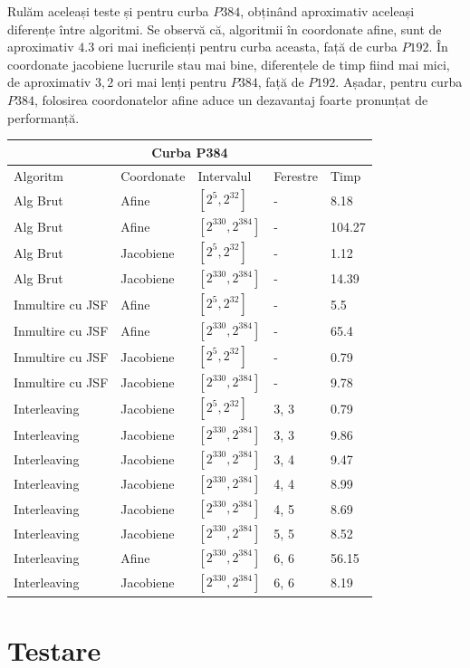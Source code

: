 Rulăm aceleași teste și pentru curba $P384$, obținând aproximativ aceleași diferențe între algoritmi. Se observă că, algoritmii în coordonate afine, sunt de aproximativ $4. 3$ ori mai ineficienți pentru curba aceasta, față de curba $P192$. În coordonate jacobiene lucrurile stau mai bine, diferențele de timp fiind mai mici, de aproximativ $3, 2$ ori mai lenți pentru $P384$, față de $P192$. Așadar, pentru curba $P384$, folosirea coordonatelor afine aduce un dezavantaj foarte pronunțat de performanță.

\begin{tabular}{ |p{5cm}||p{3cm}|p{3cm}|p{2cm}|p{1cm}|  }
 \hline
 \multicolumn{5}{|c|}{Curba P384} \\
  \hline
  Algoritm& Coordonate &Intervalul &Ferestre &Timp\\
 \hline
  Alg Brut & Afine  &$[2^{5},2^{32}]$& - & 8.18\\
 Alg Brut & Afine  &$[2^{330},2^{384}]$& - & 104.27 \\
 Alg Brut & Jacobiene  &$[2^{5},2^{32}]$& - & 1.12 \\
 Alg Brut & Jacobiene  &$[2^{330},2^{384}]$& - & 14.39 \\
 Inmultire cu JSF & Afine  &$[2^{5},2^{32}]$& - & 5.5 \\
 Inmultire cu JSF & Afine  &$[2^{330},2^{384}]$& - & 65.4 \\
 Inmultire cu JSF & Jacobiene  &$[2^{5},2^{32}]$& - & 0.79 \\
 Inmultire cu JSF & Jacobiene  &$[2^{330},2^{384}]$& - & 9.78 \\
 Interleaving & Jacobiene  &$[2^{5},2^{32}]$& 3, 3 & 0.79 \\
 Interleaving & Jacobiene  &$[2^{330},2^{384}]$& 3, 3 & 9.86\\
 Interleaving & Jacobiene  &$[2^{330},2^{384}]$& 3, 4 &  9.47\\
 Interleaving & Jacobiene  &$[2^{330},2^{384}]$& 4, 4 & 8.99 \\
 Interleaving & Jacobiene  &$[2^{330},2^{384}]$& 4, 5 & 8.69 \\
 Interleaving & Jacobiene  &$[2^{330},2^{384}]$& 5, 5 & 8.52 \\
 Interleaving & Afine  &$[2^{330},2^{384}]$& 6, 6 & 56.15 \\
 Interleaving & Jacobiene  &$[2^{330},2^{384}]$& 6, 6 & 8.19 \\
 \hline
\end{tabular}

\section{Testare}

